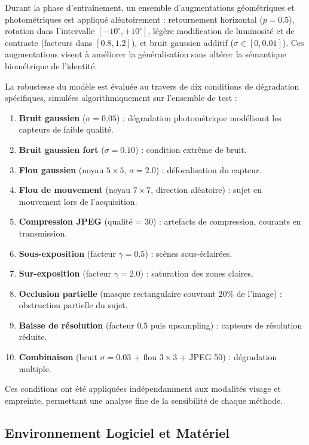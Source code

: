 \documentclass[12pt,a4paper]{report}
\begin{document}
Durant la phase d'entra\^{i}nement, un ensemble d'augmentations g\'{e}om\'{e}triques et photom\'{e}triques est appliqu\'{e} al\'{e}atoirement : retournement horizontal ($p = 0.5$), rotation dans l'intervalle $[-10^\circ, +10^\circ]$, l\'{e}g\`{e}re modification de luminosit\'{e} et de contraste (facteurs dans $[0.8, 1.2]$), et bruit gaussien additif ($\sigma \in [0, 0.01]$). Ces augmentations visent \`{a} am\'{e}liorer la g\'{e}n\'{e}ralisation sans alt\'{e}rer la s\'{e}mantique biom\'{e}trique de l'identit\'{e}.

La robustesse du mod\`{e}le est \'{e}valu\'{e}e au travers de dix conditions de d\'{e}gradation sp\'{e}cifiques, simul\'{e}es algorithmiquement sur l'ensemble de test :
\begin{enumerate}
    \item \textbf{Bruit gaussien} ($\sigma = 0.05$) : d\'{e}gradation photom\'{e}trique mod\'{e}lisant les capteurs de faible qualit\'{e}.
    \item \textbf{Bruit gaussien fort} ($\sigma = 0.10$) : condition extr\^{e}me de bruit.
    \item \textbf{Flou gaussien} (noyau $5 \times 5$, $\sigma = 2.0$) : d\'{e}focalisation du capteur.
    \item \textbf{Flou de mouvement} (noyau $7 \times 7$, direction al\'{e}atoire) : sujet en mouvement lors de l'acquisition.
    \item \textbf{Compression JPEG} (qualit\'{e} = 30) : artefacts de compression, courants en transmission.
    \item \textbf{Sous-exposition} (facteur $\gamma = 0.5$) : sc\`{e}nes sous-\'{e}clair\'{e}es.
    \item \textbf{Sur-exposition} (facteur $\gamma = 2.0$) : saturation des zones claires.
    \item \textbf{Occlusion partielle} (masque rectangulaire couvrant $20\%$ de l'image) : obstruction partielle du sujet.
    \item \textbf{Baisse de r\'{e}solution} (facteur $0.5$ puis upsampling) : capteurs de r\'{e}solution r\'{e}duite.
    \item \textbf{Combinaison} (bruit $\sigma = 0.03$ + flou $3 \times 3$ + JPEG 50) : d\'{e}gradation multiple.
\end{enumerate}
Ces conditions ont \'{e}t\'{e} appliqu\'{e}es ind\'{e}pendamment aux modalit\'{e}s visage et empreinte, permettant une analyse fine de la sensibilit\'{e} de chaque m\'{e}thode.

\subsection{Environnement Logiciel et Mat\'{e}riel}
\end{document}
